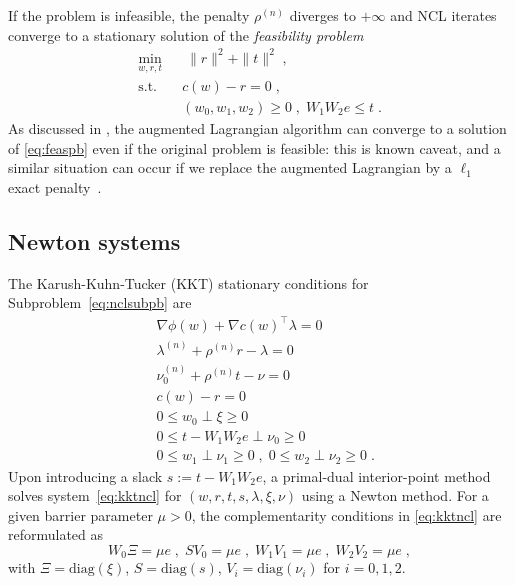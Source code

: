 \documentclass{IEEEtran4PSCC}
\newcommand{\add}[1]{#1}
\begin{document}
If the problem is infeasible, the penalty $\rho^{(n)}$ diverges to $+\infty$
and NCL iterates converge to a stationary solution of the \emph{feasibility problem}
\begin{equation}
  \label{eq:feaspb}
  \begin{aligned}
    \min_{w, r, t} \; & \; \|r\|^2 + \|t\|^2 \;, \\
    \text{s.t.} \quad & c(w) - r = 0 \;, \\
                      & (w_0, w_1, w_2) \geq 0 \; , \; W_1 W_2 e \leq t \;.
  \end{aligned}
\end{equation}
\add{As discussed in \cite{izmailov2012global}, the augmented Lagrangian algorithm
can converge to a solution of \eqref{eq:feaspb} even if the original problem
is feasible: this is known caveat, and a similar situation can occur if we
replace the augmented Lagrangian by a $\ell_1$ exact penalty~\cite{leyffer2006interior}.}

\subsection{Newton systems}
\label{sec:ncl:newton}
The Karush-Kuhn-Tucker (KKT) stationary conditions for Subproblem~\eqref{eq:nclsubpb} are
\begin{equation}
  \label{eq:kktncl}
  \begin{aligned}
    & \nabla \phi(w) + \nabla c(w)^\top \lambda = 0\\
    & \lambda^{(n)} + \rho^{(n)} r - \lambda = 0 \\
    & \nu_0^{(n)} + \rho^{(n)} t - \nu = 0 \\
    & c(w) - r = 0 \\
    & 0 \leq w_0 \perp \xi \geq 0 \\
    & 0 \leq t - W_1 W_2 e \perp \nu_0 \geq 0 \\
    & 0 \leq w_1 \perp \nu_1 \geq 0 \; , \; 0 \leq w_2 \perp \nu_2 \geq 0 \; .
  \end{aligned}
\end{equation}
Upon introducing a slack $s := t - W_1 W_2e$, a primal-dual interior-point method
solves system~\eqref{eq:kktncl} for $(w, r, t, s, \lambda, \xi, \nu)$ using a Newton method. For a given
barrier parameter $\mu > 0$, the complementarity conditions in \eqref{eq:kktncl} are reformulated as
\begin{equation}
  W_0 \Xi = \mu e \; , \; S V_0 = \mu e \; , \; W_1 V_1 = \mu e \; , \; W_2 V_2 = \mu e \; ,
\end{equation}
with $\Xi = \text{diag}(\xi)$, $S = \text{diag}(s)$, $V_i = \text{diag}(\nu_i)$ for $i=0,1,2$.
\end{document}
